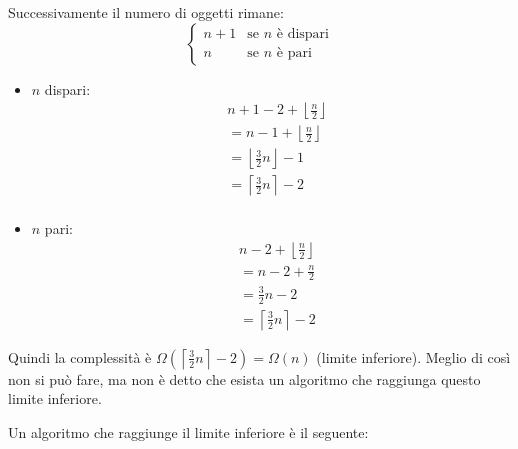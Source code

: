 \documentclass[a4paper]{article}
\begin{document}
\begin{itemize}
    \vspace{1em}
    \noindent
    Successivamente il numero di oggetti rimane:
    \[
      \begin{cases}
        n+1 & \text{se } n \text{ è dispari}\\
        n & \text{se } n \text{ è pari}
      \end{cases}
    \] 
    \begin{itemize}
      \item \( n \) dispari:
        \[
          \begin{aligned}
            &n+1 - 2 + \left\lfloor \frac{n}{2} \right\rfloor\\
            &= n-1 + \left\lfloor \frac{n}{2} \right\rfloor\\
            &= \left\lfloor \frac{3}{2}n \right\rfloor - 1\\
            &= \left\lceil \frac{3}{2}n \right\rceil - 2\\
          \end{aligned}
        \] 

      \item \( n \) pari:
        \[
          \begin{aligned}
            &n - 2 + \left\lfloor \frac{n}{2} \right\rfloor \\
            &= n-2 + \frac{n}{2}\\
            &= \frac{3}{2}n - 2\\
            &= \left\lceil \frac{3}{2}n \right\rceil -2
          \end{aligned}
        \]
    \end{itemize}
    Quindi la complessità è \( \Omega(\left\lceil \frac{3}{2}n \right\rceil -2) = \Omega(n)
    \) (limite inferiore). Meglio di così non si può fare, ma non è detto che esista
    un algoritmo che raggiunga questo limite inferiore.
\end{itemize}
Un algoritmo che raggiunge il limite inferiore è il seguente:
\end{document}

